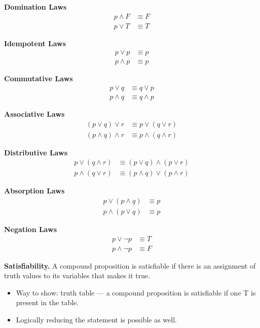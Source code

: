 \documentclass{article}
\begin{document}
\medskip

\textbf{Domination Laws}
\begin{align*}
p \land F &\equiv F \\
p \lor T &\equiv T
\end{align*}

\medskip

\textbf{Idempotent Laws}
\begin{align*}
p \lor p &\equiv p \\
p \land p &\equiv p
\end{align*}

\medskip

\textbf{Commutative Laws}
\begin{align*}
p \lor q &\equiv q \lor p \\
p \land q &\equiv q \land p
\end{align*}

\medskip

\textbf{Associative Laws}
\begin{align*}
(p \lor q) \lor r &\equiv p \lor (q \lor r) \\
(p \land q) \land r &\equiv p \land (q \land r)
\end{align*}

\medskip

\textbf{Distributive Laws}
\begin{align*}
p \lor (q \land r) &\equiv (p \lor q) \land (p \lor r) \\
p \land (q \lor r) &\equiv (p \land q) \lor (p \land r)
\end{align*}

\medskip

\textbf{Absorption Laws}
\begin{align*}
p \lor (p \land q) &\equiv p \\
p \land (p \lor q) &\equiv p
\end{align*}

\medskip

\textbf{Negation Laws}
\begin{align*}
p \lor \lnot p &\equiv T \\
p \land \lnot p &\equiv F
\end{align*}

\bigskip

\textbf{Satisfiability.} A compound proposition is satisfiable if there is an assignment of truth values to its variables that makes it true.

\medskip

\begin{itemize}
\item Way to show: truth table --- a compound proposition is satisfiable if one T is present in the table.
\item Logically reducing the statement is possible as well.
\end{itemize}
\end{document}
